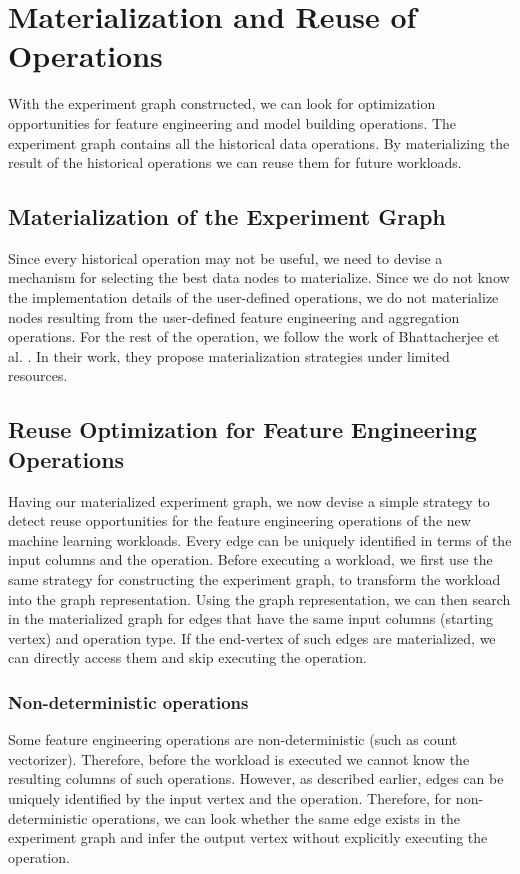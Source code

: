 \section{Materialization and Reuse of Operations}\label{sec-materializaiton-and-reuse}
With the experiment graph constructed, we can look for optimization opportunities for feature engineering and model building operations.
The experiment graph contains all the historical data operations.
By materializing the result of the historical operations we can reuse them for future workloads.

\subsection{Materialization of the Experiment Graph}
Since every historical operation may not be useful, we need to devise a mechanism for selecting the best data nodes to materialize.
Since we do not know the implementation details of the user-defined operations, we do not materialize nodes resulting from the user-defined feature engineering and aggregation operations.
For the rest of the operation, we follow the work of Bhattacherjee et al. \cite{bhattacherjee2015principles}.
In their work, they propose materialization strategies under limited resources.


\subsection{Reuse Optimization for Feature Engineering Operations}
Having our materialized experiment graph, we now devise a simple strategy to detect reuse opportunities for the feature engineering operations of the new machine learning workloads.
Every edge can be uniquely identified in terms of the input columns and the operation.
Before executing a workload, we first use the same strategy for constructing the experiment graph, to transform the workload into the graph representation.
Using the graph representation, we can then search in the materialized graph for edges that have the same input columns (starting vertex) and operation type.
If the end-vertex of such edges are materialized, we can directly access them and skip executing the operation.

\subsubsection{Non-deterministic operations}
Some feature engineering operations are non-deterministic (such as count vectorizer).
Therefore, before the workload is executed we cannot know the resulting columns of such operations.
However, as described earlier, edges can be uniquely identified by the input vertex and the operation.
Therefore, for non-deterministic operations, we can look whether the same edge exists in the experiment graph and infer the output vertex without explicitly executing the operation.

